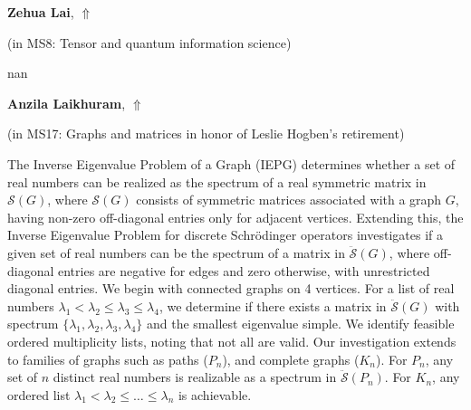 \documentclass[ILAS2025-program.tex]{subfiles}
\begin{document}
\hypertarget{down0284}{}\begin{ilasabstract}
    
\textbf{Zehua Lai},  \hfill \hyperlink{up0284}{$\Uparrow$}
    
    
(in {\color{mstitle}MS8: Tensor and quantum information science})
        
\mtskip
    nan
\end{ilasabstract}
    

\hypertarget{down0223}{}\begin{ilasabstract}
    
\textbf{Anzila Laikhuram},  \hfill \hyperlink{up0223}{$\Uparrow$}
    
    
(in {\color{mstitle}MS17: Graphs and matrices in honor of Leslie Hogben's retirement})
        
\mtskip
    The Inverse Eigenvalue Problem of a Graph (IEPG) determines whether a set of real numbers can be realized as the spectrum of a real symmetric matrix in $\mathcal{S}(G)$, where $\mathcal{S}(G)$ consists of symmetric matrices associated with a graph $G$, having non-zero off-diagonal entries only for adjacent vertices. Extending this, the Inverse Eigenvalue Problem for discrete Schr\"odinger operators investigates if a given set of real numbers can be the spectrum of a matrix in $\ddot{\mathcal{S}}(G)$, where off-diagonal entries are negative for edges and zero otherwise, with unrestricted diagonal entries. We begin with connected graphs on 4 vertices. For a list of real numbers $\lambda_1 < \lambda_2 \leq \lambda_3 \leq \lambda_4$, we determine if there exists a matrix in $\ddot{\mathcal{S}}(G)$ with spectrum $\{\lambda_1, \lambda_2, \lambda_3, \lambda_4\}$ and the smallest eigenvalue simple. We identify feasible ordered multiplicity lists, noting that not all are valid.   Our investigation extends to families of graphs such as paths ($P_n$), and complete graphs ($K_n$). For $P_n$, any set of $n$ distinct real numbers is realizable as a spectrum in $\ddot{\mathcal{S}}(P_n)$. For $K_n$, any ordered list $\lambda_1 < \lambda_2 \leq \dots \leq \lambda_n$ is achievable. 
\end{ilasabstract}
    
\end{document}

